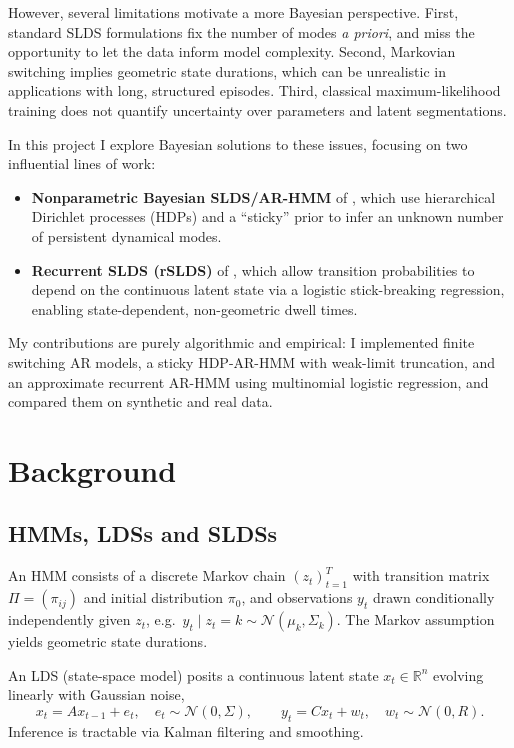 \documentclass[11pt]{article}
\begin{document}
However, several limitations motivate a more Bayesian perspective.
First, standard SLDS formulations fix the number of modes \emph{a
priori}, and miss the opportunity to let the data inform model
complexity. Second, Markovian switching implies geometric state
durations, which can be unrealistic in applications with long, structured
episodes. Third, classical maximum-likelihood training does not quantify
uncertainty over parameters and latent segmentations.

In this project I explore Bayesian solutions to these issues, focusing on
two influential lines of work:
\begin{itemize}
  \item \textbf{Nonparametric Bayesian SLDS/AR-HMM} of \citet{fox2008},
    which use hierarchical Dirichlet processes (HDPs) and a ``sticky''
    prior to infer an unknown number of persistent dynamical modes.
  \item \textbf{Recurrent SLDS (rSLDS)} of \citet{linderman2017}, which
    allow transition probabilities to depend on the continuous latent
    state via a logistic stick-breaking regression, enabling
    state-dependent, non-geometric dwell times.
\end{itemize}

My contributions are purely algorithmic and empirical: I implemented
finite switching AR models, a sticky HDP-AR-HMM with weak-limit
truncation, and an approximate recurrent AR-HMM using multinomial
logistic regression, and compared them on synthetic and real data.

\section{Background}

\subsection{HMMs, LDSs and SLDSs}

An HMM consists of a discrete Markov chain $(z_t)_{t=1}^T$ with
transition matrix $\Pi = (\pi_{ij})$ and initial distribution $\pi_0$,
and observations $y_t$ drawn conditionally independently given $z_t$,
e.g.\ $y_t \mid z_t = k \sim \mathcal{N}(\mu_k, \Sigma_k)$. The Markov
assumption yields geometric state durations.

An LDS (state-space model) posits a continuous latent state $x_t \in
\mathbb{R}^n$ evolving linearly with Gaussian noise,
\[
  x_t = A x_{t-1} + e_t, \quad e_t \sim \mathcal{N}(0, \Sigma),
  \qquad
  y_t = C x_t + w_t, \quad w_t \sim \mathcal{N}(0, R).
\]
Inference is tractable via Kalman filtering and smoothing.
\end{document}
